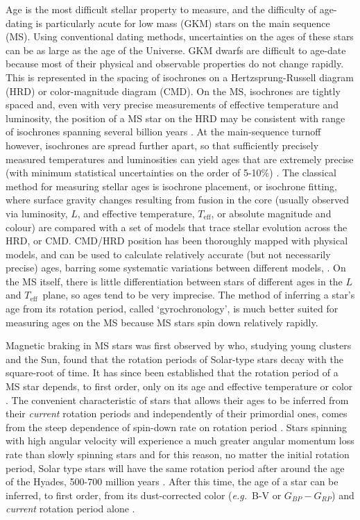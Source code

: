 \documentclass[useAMS, usenatbib, preprint, 12pt]{aastex}
\newcommand{\eg}{{\it e.g.}}
\newcommand{\teff}{$T_{\mathrm{eff}}$}
\newcommand{\gcolor}{$G_{BP} - G_{RP}$}
\begin{document}
Age is the most difficult stellar property to measure, and the difficulty of
age-dating is particularly acute for low mass (GKM) stars on the main sequence
(MS).
Using conventional dating methods, uncertainties on the ages of these stars
can be as large as the age of the Universe.
GKM dwarfs are difficult to age-date because most of their physical and
observable properties do not change rapidly.
This is represented in the spacing of isochrones on a Hertzsprung-Russell
diagram (HRD) or color-magnitude diagram (CMD).
On the MS, isochrones are tightly spaced and, even with very precise
measurements of effective temperature and luminosity, the position of a MS
star on the HRD may be consistent with range of isochrones spanning several
billion years \citep[see][for a review of stellar ages]{soderblom2010}.
At the main-sequence turnoff however, isochrones are spread further apart, so
that sufficiently precisely measured temperatures and luminosities can yield
ages that are extremely precise (with minimum statistical uncertainties on the
order of 5-10\%) \citep[\eg][]{pont2004}.
The classical method for measuring stellar ages is isochrone placement, or
isochrone fitting, where surface gravity changes resulting from fusion in the
core (usually observed via luminosity, $L$, and effective temperature, \teff,
or absolute magnitude and colour) are compared with a set of models that trace
stellar evolution across the HRD, or CMD.
CMD/HRD position has been thoroughly mapped with physical models, and can be
used to calculate relatively accurate (but not necessarily precise) ages,
barring some systematic variations between different models,
\citep[\eg][]{yi2001, dotter2008, dotter2016}.
On the MS itself, there is little differentiation between stars of different
ages in the $L$ and \teff\ plane, so ages tend to be very imprecise.
The method of inferring a star's age from its rotation period, called
`gyrochronology', is much better suited for measuring ages on the MS because
MS stars spin down relatively rapidly.

Magnetic braking in MS stars was first observed by \citet{skumanich1972} who,
studying young clusters and the Sun, found that the rotation periods of
Solar-type stars decay with the square-root of time.
It has since been established that the rotation period of a MS star depends,
to first order, only on its age and effective temperature or color
\citep[\eg][]{barnes2003}.
The convenient characteristic of stars that allows their ages to be inferred
from their {\it current} rotation periods and independently of their
primordial ones, comes from the steep dependence of spin-down rate on rotation
period \citep{kawaler1989}.
Stars spinning with high angular velocity will experience a much greater
angular momentum loss rate than slowly spinning stars and for this reason, no
matter the initial rotation period, Solar type stars will have the same
rotation period after around the age of the Hyades, 500-700 million years
\citep{irwin2009, gallet2015}.
After this time, the age of a star can be inferred, to first order, from its
dust-corrected color (\eg\ B-V or \gcolor) and {\it current} rotation period
alone \citep[See][for an analysis of how initial conditions effect gyrochronal
ages]{epstein2014}.
\end{document}
